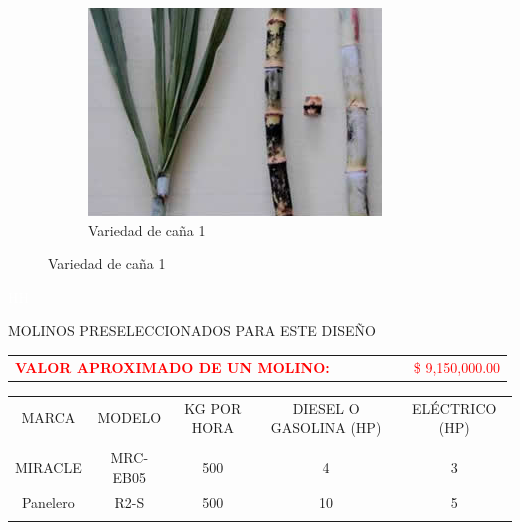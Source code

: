 \documentclass{article}%
\begin{document}
\begin{figure}[h!]%
\begin{subfigure}{0.33\linewidth}%
\includegraphics[width=0.95\linewidth]{Cana/RD75-11.png}%
\caption{Variedad de caña 1}%
\end{subfigure}%
\linebreak%
\newpage%
\end{figure}

%
\newpage%
\textcolor{white}{%
HH%
}%
\newpage%
\begin{center}%
\begin{Huge}%
MOLINOS PRESELECCIONADOS PARA ESTE DISEÑO%
\end{Huge}%
\linebreak%
\end{center}%
\begin{tabular}{lcccccl}%
\textcolor{red}{%
\textbf{VALOR APROXIMADO DE UN MOLINO: }%
}& & & & & &\textcolor{red}{%
\$ 9,150,000.00%
}\\%
\end{tabular}%
\linebreak%
\begin{tabular}{ccccc}%
MARCA&MODELO&KG POR HORA&DIESEL O GASOLINA (HP)&ELÉCTRICO (HP)\\%
&&&&\\%
MIRACLE&MRC{-}EB05&500&4&3\\%
Panelero&R2{-}S&500&10&5\\%
\linebreak%
\newline%
%
\linebreak%
\end{tabular}%
\end{document}
